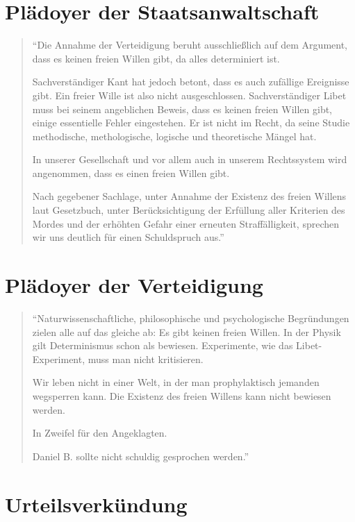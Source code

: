 \documentclass[
  a4paper,
]{report}
\begin{document}
\hypertarget{pr-plea}{%
\section{Plädoyer der Staatsanwaltschaft}\label{pr-plea}}

\begin{quote}
``Die Annahme der Verteidigung beruht ausschließlich auf dem Argument, dass es keinen freien Willen gibt, da alles determiniert ist.

Sachverständiger Kant hat jedoch betont, dass es auch zufällige Ereignisse gibt. Ein freier Wille ist also nicht ausgeschlossen. Sachverständiger Libet muss bei seinem angeblichen Beweis, dass es keinen freien Willen gibt, einige essentielle Fehler eingestehen. Er ist nicht im Recht, da seine Studie methodische, methologische, logische und theoretische Mängel hat.

In unserer Gesellschaft und vor allem auch in unserem Rechtssystem wird angenommen, dass es einen freien Willen gibt.

Nach gegebener Sachlage, unter Annahme der Existenz des freien Willens laut Gesetzbuch, unter Berücksichtigung der Erfüllung aller Kriterien des Mordes und der erhöhten Gefahr einer erneuten Straffälligkeit, sprechen wir uns deutlich für einen Schuldspruch aus.''
\end{quote}

\hypertarget{def-plea}{%
\section{Plädoyer der Verteidigung}\label{def-plea}}

\begin{quote}
``Naturwissenschaftliche, philosophische und psychologische Begründungen zielen alle auf das gleiche ab: Es gibt keinen freien Willen. In der Physik gilt Determinismus schon als bewiesen. Experimente, wie das Libet-Experiment, muss man nicht kritisieren.

Wir leben nicht in einer Welt, in der man prophylaktisch jemanden wegsperren kann. Die Existenz des freien Willens kann nicht bewiesen werden.

In Zweifel für den Angeklagten.

Daniel B. sollte nicht schuldig gesprochen werden.''
\end{quote}

\hypertarget{sentencing}{%
\section{Urteilsverkündung}\label{sentencing}}
\end{document}

